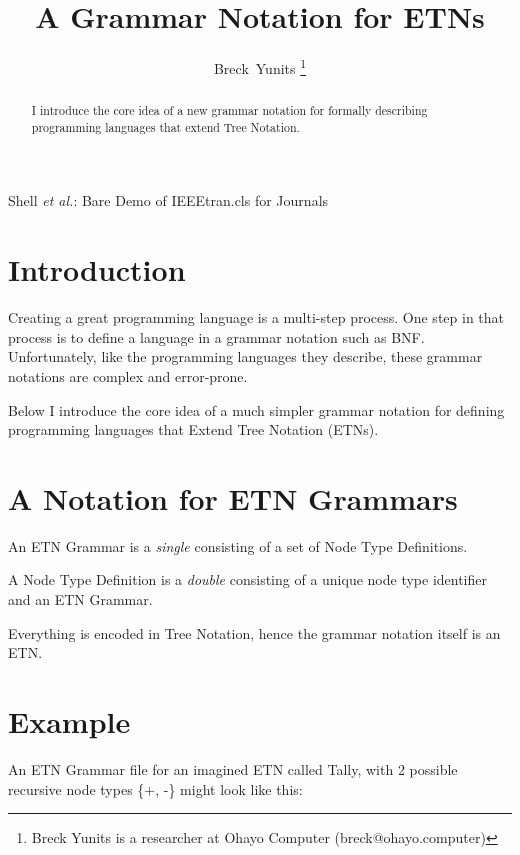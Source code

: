 \documentclass[journal]{IEEEtran}
\begin{document}
\title{A Grammar Notation for ETNs}

\author{Breck~Yunits%
\thanks{Breck Yunits is a researcher at Ohayo Computer (breck@ohayo.computer)}%
}

%
{Shell \MakeLowercase{\textit{et al.}}: Bare Demo of IEEEtran.cls for Journals}

\maketitle


\begin{abstract}
I introduce the core idea of a new grammar notation for formally describing programming languages that extend Tree Notation.
\end{abstract}

\IEEEpeerreviewmaketitle

\section{Introduction}

Creating a great programming language is a multi-step process. One step in that process is to define a language in a grammar notation such as BNF. Unfortunately, like the programming languages they describe, these grammar notations are complex and error-prone.

Below I introduce the core idea of a much simpler grammar notation for defining programming languages that Extend Tree Notation (ETNs).

\section{A Notation for ETN Grammars}

An ETN Grammar is a \textit{single} consisting of a set of Node Type Definitions.

A Node Type Definition is a \textit{double} consisting of a unique node type identifier and an ETN Grammar.

Everything is encoded in Tree Notation, hence the grammar notation itself is an ETN.

\section{Example}

An ETN Grammar file for an imagined ETN called Tally, with 2 possible recursive node types \{+, -\} might look like this:
\end{document}
